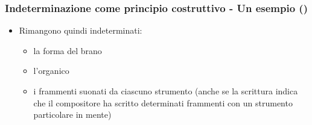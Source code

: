 \begin{frame}
    \frametitle{Indeterminazione come principio costruttivo - Un esempio ()}

    \begin{itemize}

        \item Rimangono quindi indeterminati:

        \begin{itemize}

            \item la forma del brano

            \item l'organico

            \item i frammenti suonati da ciascuno strumento
                (anche se la scrittura indica che il compositore
                ha scritto determinati frammenti
                con un strumento particolare in mente)

        \end{itemize}

    \end{itemize}

\end{frame}
